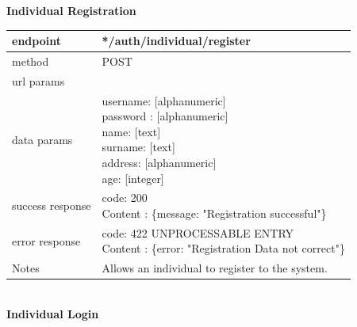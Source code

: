 \begin{legal}
\begin{legal}
\begin{itemize}
						\textbf{Individual Registration} \\
			
							\begin{tabularx}{\linewidth}{| l | l |}
								\hline
								endpoint & */auth/individual/register \\
								\hline
								method & POST \\
								\hline
								url params & \\
								\hline
								data params &
								\parbox{0.7\textwidth}{
									\bigskip
									username: [alphanumeric]\\
									password : [alphanumeric]\\
									name: [text]\\
									surname: [text]\\
									address: [alphanumeric]\\
									age: [integer]
									\bigskip
								} \\
								\hline
								success response &
								\parbox{0.7\textwidth}{
									\bigskip
									code: 200\\
									Content : \{message: "Registration successful"\}
									\bigskip
								} \\
								\hline
								error response &
								\parbox{0.7\textwidth}{
									\bigskip
									code: 422 UNPROCESSABLE ENTRY \\
									Content : \{error: "Registration Data not correct"\}
									\bigskip
								} \\
								\hline
								Notes & 
								\parbox{0.7\textwidth}{
									\bigskip Allows an individual to register to the system.
								\bigskip}  \\
								\hline
							\end{tabularx}\\
					
							\textbf{Individual Login}\\


\end{itemize}
\end{legal}
\end{legal}
